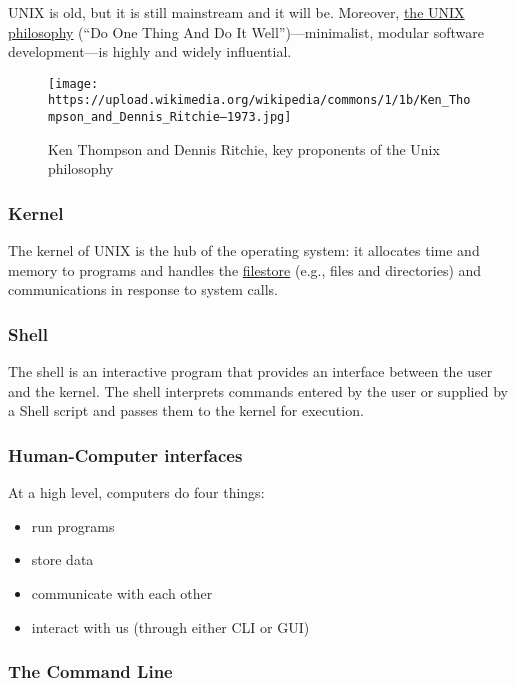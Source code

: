 \documentclass[
]{book}
\providecommand{\tightlist}{%
  \setlength{\itemsep}{0pt}\setlength{\parskip}{0pt}}
\begin{document}
UNIX is old, but it is still mainstream and it will be. Moreover, \href{https://en.wikipedia.org/wiki/Unix_philosophy}{the UNIX philosophy} (``Do One Thing And Do It Well'')---minimalist, modular software development---is highly and widely influential.

\begin{figure}
\centering
\texttt{[image: https://upload.wikimedia.org/wikipedia/commons/1/1b/Ken\_Thompson\_and\_Dennis\_Ritchie--1973.jpg]}
\caption{Ken Thompson and Dennis Ritchie, key proponents of the Unix philosophy}
\end{figure}

\hypertarget{kernel}{%
\subsubsection{Kernel}\label{kernel}}

The kernel of UNIX is the hub of the operating system: it allocates time and memory to programs and handles the \href{http://users.ox.ac.uk/~martinw/unix/chap3.html}{filestore} (e.g., files and directories) and communications in response to system calls.

\hypertarget{shell}{%
\subsubsection{Shell}\label{shell}}

The shell is an interactive program that provides an interface between the user and the kernel. The shell interprets commands entered by the user or supplied by a Shell script and passes them to the kernel for execution.

\hypertarget{human-computer-interfaces}{%
\subsubsection{Human-Computer interfaces}\label{human-computer-interfaces}}

At a high level, computers do four things:

\begin{itemize}
\tightlist
\item
  run programs
\item
  store data
\item
  communicate with each other
\item
  interact with us (through either CLI or GUI)
\end{itemize}

\hypertarget{the-command-line}{%
\subsubsection{The Command Line}\label{the-command-line}}
\end{document}
